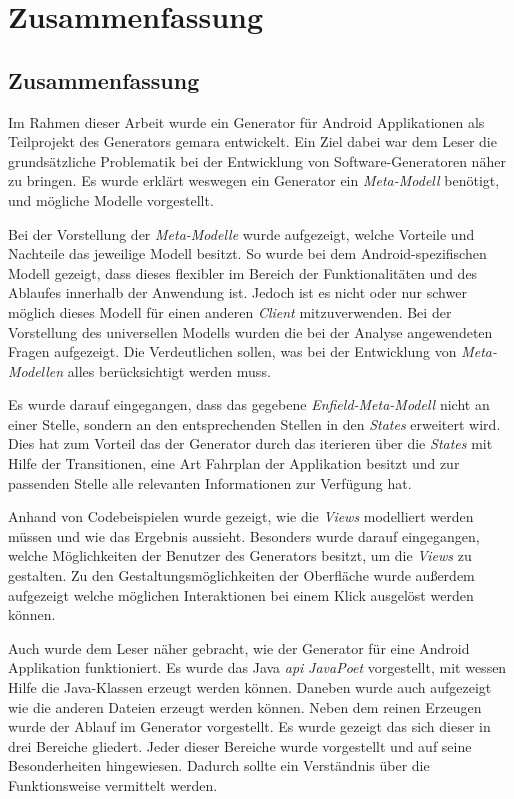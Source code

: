\chapter{Zusammenfassung}
\section{Zusammenfassung}
Im Rahmen dieser Arbeit wurde ein Generator für Android Applikationen als Teilprojekt des Generators \acf{gemara} entwickelt.
Ein Ziel dabei war dem Leser die grundsätzliche Problematik bei der Entwicklung von Software-Generatoren näher zu bringen.
Es wurde erklärt weswegen ein Generator ein \textit{Meta-Modell} benötigt, und mögliche Modelle vorgestellt. 

Bei der Vorstellung der \textit{Meta-Modelle} wurde aufgezeigt, welche Vorteile und Nachteile das jeweilige Modell besitzt. So wurde bei dem Android-spezifischen Modell gezeigt, dass dieses flexibler im Bereich der Funktionalitäten und des Ablaufes innerhalb der Anwendung ist. Jedoch ist es nicht oder nur schwer möglich dieses Modell für einen anderen \textit{Client} mitzuverwenden. Bei der Vorstellung des universellen Modells wurden die bei der Analyse angewendeten Fragen aufgezeigt. Die Verdeutlichen sollen, was bei der Entwicklung von \textit{Meta-Modellen} alles berücksichtigt werden muss.

Es wurde darauf eingegangen, dass das gegebene \textit{Enfield-Meta-Modell} nicht an einer Stelle, sondern an den entsprechenden Stellen in den \textit{States} erweitert wird. Dies hat zum Vorteil das der Generator durch das iterieren über die \textit{States} mit Hilfe der Transitionen, eine Art Fahrplan der Applikation besitzt und zur passenden Stelle alle relevanten Informationen zur Verfügung hat.

Anhand von Codebeispielen wurde gezeigt, wie die \textit{Views} modelliert werden müssen und wie das Ergebnis aussieht. Besonders wurde darauf eingegangen, welche Möglichkeiten der Benutzer des Generators besitzt, um die \textit{Views} zu gestalten. Zu den Gestaltungsmöglichkeiten der Oberfläche wurde außerdem aufgezeigt welche möglichen Interaktionen bei einem Klick ausgelöst werden können.

Auch wurde dem Leser näher gebracht, wie der Generator für eine Android Applikation funktioniert. Es wurde das Java \textit{\acf{api}} \textit{JavaPoet} vorgestellt, mit wessen Hilfe die Java-Klassen erzeugt werden können. Daneben wurde auch aufgezeigt wie die anderen Dateien erzeugt werden können. 
Neben dem reinen Erzeugen wurde der Ablauf im Generator vorgestellt. Es wurde gezeigt das sich dieser in drei Bereiche gliedert.
Jeder dieser Bereiche wurde vorgestellt und auf seine Besonderheiten hingewiesen. Dadurch sollte ein Verständnis über die Funktionsweise vermittelt werden.  

